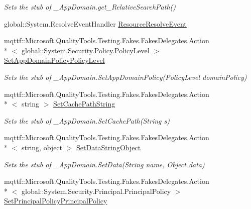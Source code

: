 \begin{DoxyCompactItemize}
\begin{DoxyCompactList}\small\item\em Sets the stub of \-\_\-\-App\-Domain.\-get\-\_\-\-Relative\-Search\-Path()\end{DoxyCompactList}\item 
global\-::\-System.\-Resolve\-Event\-Handler \hyperlink{class_system_1_1_fakes_1_1_stub___app_domain_aff4c8c4feaaf1a5250482c2fb85c7ae4}{Resource\-Resolve\-Event}
\item 
mqttf\-::\-Microsoft.\-Quality\-Tools.\-Testing.\-Fakes.\-Fakes\-Delegates.\-Action\\*
$<$ global\-::\-System.\-Security.\-Policy.\-Policy\-Level $>$ \hyperlink{class_system_1_1_fakes_1_1_stub___app_domain_a68326a9988c82c276e979cc301512f94}{Set\-App\-Domain\-Policy\-Policy\-Level}
\begin{DoxyCompactList}\small\item\em Sets the stub of \-\_\-\-App\-Domain.\-Set\-App\-Domain\-Policy(\-Policy\-Level domain\-Policy)\end{DoxyCompactList}\item 
mqttf\-::\-Microsoft.\-Quality\-Tools.\-Testing.\-Fakes.\-Fakes\-Delegates.\-Action\\*
$<$ string $>$ \hyperlink{class_system_1_1_fakes_1_1_stub___app_domain_a3755f3f326a70d55d065a0d903812938}{Set\-Cache\-Path\-String}
\begin{DoxyCompactList}\small\item\em Sets the stub of \-\_\-\-App\-Domain.\-Set\-Cache\-Path(\-String s)\end{DoxyCompactList}\item 
mqttf\-::\-Microsoft.\-Quality\-Tools.\-Testing.\-Fakes.\-Fakes\-Delegates.\-Action\\*
$<$ string, object $>$ \hyperlink{class_system_1_1_fakes_1_1_stub___app_domain_af95df0aaded37b64a13bf88e0bc773eb}{Set\-Data\-String\-Object}
\begin{DoxyCompactList}\small\item\em Sets the stub of \-\_\-\-App\-Domain.\-Set\-Data(\-String name, Object data)\end{DoxyCompactList}\item 
mqttf\-::\-Microsoft.\-Quality\-Tools.\-Testing.\-Fakes.\-Fakes\-Delegates.\-Action\\*
$<$ global\-::\-System.\-Security.\-Principal.\-Principal\-Policy $>$ \hyperlink{class_system_1_1_fakes_1_1_stub___app_domain_aa03336534597d578cd9bf4037fc230fb}{Set\-Principal\-Policy\-Principal\-Policy}

\end{DoxyCompactItemize}
